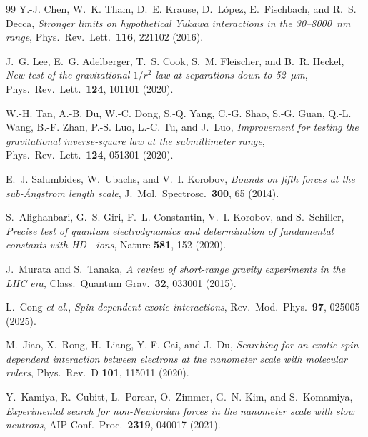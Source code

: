 \documentclass[main]{subfiles}
\begin{document}
{\begin{thebibliography}{99}
Y.-J. Chen, W.~K. Tham, D.~E. Krause, D.~L\'{o}pez, E.~Fischbach, and
R.~S. Decca,
\textit{Stronger limits on hypothetical Yukawa interactions in the
30--8000~nm range},
Phys.\ Rev.\ Lett.\ \textbf{116}, 221102 (2016).

J.~G. Lee, E.~G. Adelberger, T.~S. Cook, S.~M. Fleischer, and B.~R. Heckel,
\textit{New test of the gravitational $1/r^2$ law at separations down to
52~$\mu$m},
Phys.\ Rev.\ Lett.\ \textbf{124}, 101101 (2020).

W.-H. Tan, A.-B. Du, W.-C. Dong, S.-Q. Yang, C.-G. Shao, S.-G. Guan,
Q.-L. Wang, B.-F. Zhan, P.-S. Luo, L.-C. Tu, and J.~Luo,
\textit{Improvement for testing the gravitational inverse-square law at
the submillimeter range},
Phys.\ Rev.\ Lett.\ \textbf{124}, 051301 (2020).

E.~J. Salumbides, W.~Ubachs, and V.~I. Korobov,
\textit{Bounds on fifth forces at the sub-\AA ngstrom length scale},
J.\ Mol.\ Spectrosc.\ \textbf{300}, 65 (2014).

S.~Alighanbari, G.~S. Giri, F.~L. Constantin, V.~I. Korobov, and
S.~Schiller,
\textit{Precise test of quantum electrodynamics and determination of
fundamental constants with HD$^+$ ions},
Nature \textbf{581}, 152 (2020).

J.~Murata and S.~Tanaka,
\textit{A review of short-range gravity experiments in the LHC era},
Class.\ Quantum Grav.\ \textbf{32}, 033001 (2015).

L.~Cong \textit{et al.},
\textit{Spin-dependent exotic interactions},
Rev.\ Mod.\ Phys.\ \textbf{97}, 025005 (2025).

M.~Jiao, X.~Rong, H.~Liang, Y.-F. Cai, and J.~Du,
\textit{Searching for an exotic spin-dependent interaction between
electrons at the nanometer scale with molecular rulers},
Phys.\ Rev.\ D \textbf{101}, 115011 (2020).

Y.~Kamiya, R.~Cubitt, L.~Porcar, O.~Zimmer, G.~N. Kim, and S.~Komamiya,
\textit{Experimental search for non-Newtonian forces in the nanometer
scale with slow neutrons},
AIP Conf.\ Proc.\ \textbf{2319}, 040017 (2021).

\end{thebibliography}
}{}
\end{document}
